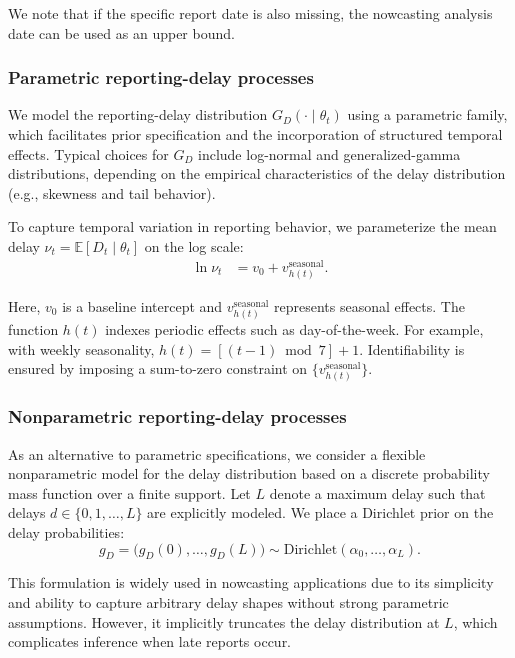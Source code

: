 \documentclass[12pt]{article}
\begin{document}
We note that if the specific report date is also missing, the nowcasting analysis date can be used as an upper bound. 

\subsubsection{Parametric reporting-delay processes}

We model the reporting-delay distribution $G_D(\cdot \mid \theta_t)$ using a parametric family, which facilitates prior specification and the incorporation of structured temporal effects. Typical choices for $G_D$ include log-normal and generalized-gamma distributions, depending on the empirical characteristics of the delay distribution (e.g., skewness and tail behavior).

To capture temporal variation in reporting behavior, we parameterize the mean delay $\nu_t = \mathbb{E}[D_t \mid \theta_t]$ on the log scale:
\begin{equation}
\begin{aligned}
    \ln \nu_t &= v_0 + v^{\text{seasonal}}_{h(t)}.    
\end{aligned}
\end{equation}

Here, $v_0$ is a baseline intercept and $v_{h(t)}^{\text{seasonal}}$ represents seasonal effects. The function $h(t)$ indexes periodic effects such as day-of-the-week. For example, with weekly seasonality, $h(t) = \left[(t - 1) \bmod 7 \right] + 1$. Identifiability is ensured by imposing a sum-to-zero constraint on $\{v_{h(t)}^{\text{seasonal}}\}$. 


\subsubsection{Nonparametric reporting-delay processes}

As an alternative to parametric specifications, we consider a flexible nonparametric model for the delay distribution based on a discrete probability mass function over a finite support. Let $L$ denote a maximum delay such that delays $d \in \{0,1,\dots,L\}$ are explicitly modeled. We place a Dirichlet prior on the delay probabilities:
\begin{equation}
    g_D = \big(g_D(0), \dots, g_D(L)\big) \sim \text{Dirichlet}(\alpha_0, \dots, \alpha_L).
\end{equation}

This formulation is widely used in nowcasting applications \cite{mcgough2020nowcasting, johnson2026baseline} due to its simplicity and ability to capture arbitrary delay shapes without strong parametric assumptions. However, it implicitly truncates the delay distribution at $L$, which complicates inference when late reports occur.
\end{document}

